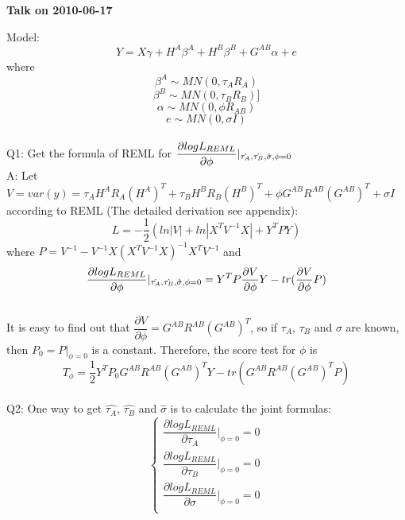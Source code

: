 \documentclass[12pt]{article}
\begin{document}
    \begin{center}
        {\bf Talk on 2010-06-17}
    \end{center}
    Model:
    \begin{equation*}
        Y=X\gamma+H^A\beta^A+H^B\beta^B+G^{AB}\alpha+e
    \end{equation*}
    where\[\beta^A\sim MN(0, \tau_A R_A)\]
    \[\beta^B\sim MN(0, \tau_B R_B)]\]
    \[\alpha\sim MN(0,\phi R_{AB})\]
    \[e\sim MN(0,\sigma I)\]\\
    Q1: Get the formula of REML for $\dfrac{\partial log L_{REML}}{\partial \phi}\arrowvert_{\hat{\tau_A},\hat{\tau_B},\hat{\sigma},\phi=0}$\\
    A: Let $V=var(y)=\tau_AH^AR_A(H^A)^T+\tau_BH^BR_B(H^B)^T+\phi G^{AB}R^{AB}(G^{AB})^T+\sigma I$\\
    according to REML (The detailed derivation see appendix):
    \begin{equation*}
        L=-\frac{1}{2}(ln|V|+ln|X^TV^{-1}X|+Y^TPY)
    \end{equation*}
    where $P=V^{-1}-V^{-1}X(X^TV^{-1}X)^{-1}X^TV^{-1}$ and
    \begin{equation*}
        \dfrac{\partial log L_{REML}}{\partial \phi}\arrowvert_{\hat{\tau_A},\hat{\tau_B},\hat{\sigma},\phi=0}=Y^TP\dfrac{\partial V}{\partial \phi}Y-tr(\dfrac{\partial V}{\partial \phi}P)
    \end{equation*}\\
    It is easy to find out that $\dfrac{\partial V}{\partial \phi}=G^{AB}R^{AB}(G^{AB})^T$, so if $\tau_A$, $\tau_B$ and $\sigma$ are known, then $P_0=P|_{\phi=0}$ is a constant. Therefore, the score test for $\phi$ is
    \begin{equation*}
        T_{\phi}=\frac{1}{2}Y^TP_0G^{AB}R^{AB}(G^{AB})^TY-tr(G^{AB}R^{AB}(G^{AB})^TP)
    \end{equation*}\\
    Q2: One way to get $\hat{\tau_A}$, $\hat{\tau_B}$ and $\hat{\sigma}$ is to calculate the joint formulas:
    \begin{equation*}
        \left\{
        \begin{aligned}
            \dfrac{\partial log L_{REML}}{\partial \tau_A}|_{\phi=0}=0\\
            \dfrac{\partial log L_{REML}}{\partial \tau_B}|_{\phi=0}=0\\
            \dfrac{\partial log L_{REML}}{\partial \sigma}|_{\phi=0}=0\\
        \end{aligned}
        \right.
    \end{equation*}
\end{document}
